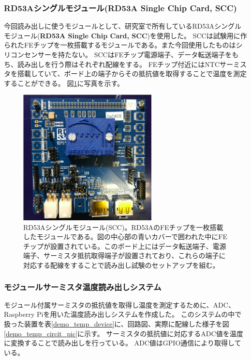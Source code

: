 \subsubsection{RD53Aシングルモジュール(RD53A Single Chip Card, SCC)\cite{5-10}}
今回読み出しに使うモジュールとして、研究室で所有しているRD53Aシングルモジュール(\textbf{RD53A Single Chip Card, SCC})を使用した。
SCCは試験用に作られたFEチップを一枚搭載するモジュールである。また今回使用したものはシリコンセンサーを持たない。
SCCはFEチップ電源端子、データ転送端子をもち、読み出しを行う際はそれぞれ配線をする。
FEチップ付近にはNTCサーミスタを搭載していて、ボード上の端子からその抵抗値を取得することで温度を測定することができる。
図\ref{demo_rd53a_SCC}に写真を示す。

\begin{figure}[h]\centering
\includegraphics[width=7cm]{./rd53a_SCC.png}
\caption[RD53Aシングルモジュール(SCC)]{RD53Aシングルモジュール(SCC)\cite{5-10}。RD53AのFEチップを一枚搭載したモジュールである。図の中心部の青いカバーで囲われた中にFEチップが設置されている。このボード上にはデータ転送端子、電源端子、サーミスタ抵抗取得端子が設置されており、これらの端子に対応する配線をすることで読み出し試験のセットアップを組む。}
\label{demo_rd53a_SCC}
\end{figure}

\subsubsection{モジュールサーミスタ温度読み出しシステム}
モジュール付属サーミスタの抵抗値を取得し温度を測定するために、ADC、Raspberry Piを用いた温度読み出しシステムを作成した。
このシステムの中で扱った装置を表\ref{demo_temp_device}に、回路図、実際に配線した様子を図\ref{demo_temp_circit_pic}に示す。
サーミスタの抵抗値に対応するADC値を温度に変換することで読み出しを行っている。
ADC値はGPIO通信\cite{5-9}により取得している。

